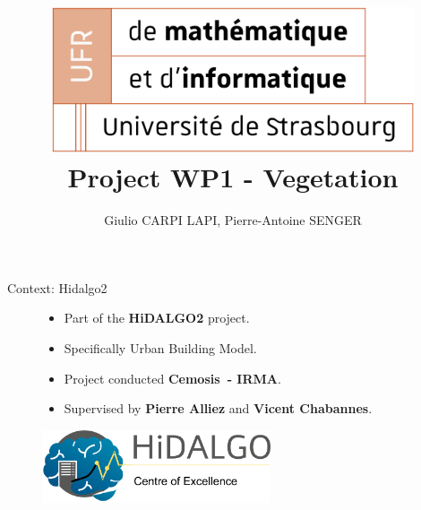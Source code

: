 \documentclass[10pt]{beamer}
\title[exMA WP1 Vegetation]{
  \includegraphics[width=0.8\textwidth]{images/logo_ufr.png}
  Project WP1 - Vegetation}
\author[PA-Giulio]{Giulio CARPI LAPI, Pierre-Antoine SENGER}
\begin{document}
\frame{\titlepage}

\begin{frame}{Context: Hidalgo2}
  \begin{figure}[H]
    \begin{itemize}
      \item Part of the \textbf{HiDALGO2}\cite{hidalgo2} project.
      \item Specifically Urban Building Model.
      \item Project conducted \textbf{Cemosis\ - IRMA}.
      \item Supervised by \textbf{Pierre Alliez} and \textbf{Vicent Chabannes}.
    \end{itemize}
    \centering
    \includegraphics[width=0.6\textwidth]{images/hidalgo2.png}
\end{figure}
\end{frame}
\end{document}
